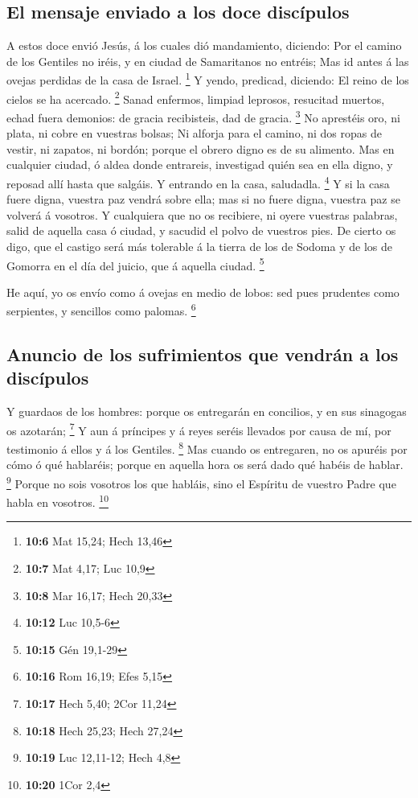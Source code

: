 \hypertarget{el-mensaje-enviado-a-los-doce-discuxedpulos}{%
\subsection{El mensaje enviado a los doce
discípulos}\label{el-mensaje-enviado-a-los-doce-discuxedpulos}}

 A estos doce envió Jesús, á los cuales dió mandamiento,
diciendo: Por el camino de los Gentiles no iréis, y en ciudad de
Samaritanos no entréis;  Mas id antes á las ovejas perdidas
de la casa de Israel. \footnote{\textbf{10:6} Mat 15,24; Hech 13,46}
 Y yendo, predicad, diciendo: El reino de los cielos se ha
acercado. \footnote{\textbf{10:7} Mat 4,17; Luc 10,9}  Sanad
enfermos, limpiad leprosos, resucitad muertos, echad fuera demonios: de
gracia recibisteis, dad de gracia. \footnote{\textbf{10:8} Mar 16,17;
  Hech 20,33}  No aprestéis oro, ni plata, ni cobre en
vuestras bolsas;  Ni alforja para el camino, ni dos ropas
de vestir, ni zapatos, ni bordón; porque el obrero digno es de su
alimento.  Mas en cualquier ciudad, ó aldea donde
entrareis, investigad quién sea en ella digno, y reposad allí hasta que
salgáis.  Y entrando en la casa, saludadla. \footnote{\textbf{10:12}
  Luc 10,5-6}  Y si la casa fuere digna, vuestra paz vendrá
sobre ella; mas si no fuere digna, vuestra paz se volverá á vosotros.
 Y cualquiera que no os recibiere, ni oyere vuestras
palabras, salid de aquella casa ó ciudad, y sacudid el polvo de vuestros
pies.  De cierto os digo, que el castigo será más tolerable
á la tierra de los de Sodoma y de los de Gomorra en el día del juicio,
que á aquella ciudad. \footnote{\textbf{10:15} Gén 19,1-29}

 He aquí, yo os envío como á ovejas en medio de lobos: sed
pues prudentes como serpientes, y sencillos como palomas. \footnote{\textbf{10:16}
  Rom 16,19; Efes 5,15}

\hypertarget{anuncio-de-los-sufrimientos-que-vendruxe1n-a-los-discuxedpulos}{%
\subsection{Anuncio de los sufrimientos que vendrán a los
discípulos}\label{anuncio-de-los-sufrimientos-que-vendruxe1n-a-los-discuxedpulos}}

 Y guardaos de los hombres: porque os entregarán en
concilios, y en sus sinagogas os azotarán; \footnote{\textbf{10:17} Hech
  5,40; 2Cor 11,24}  Y aun á príncipes y á reyes seréis
llevados por causa de mí, por testimonio á ellos y á los Gentiles.
\footnote{\textbf{10:18} Hech 25,23; Hech 27,24}  Mas
cuando os entregaren, no os apuréis por cómo ó qué hablaréis; porque en
aquella hora os será dado qué habéis de hablar. \footnote{\textbf{10:19}
  Luc 12,11-12; Hech 4,8}  Porque no sois vosotros los que
habláis, sino el Espíritu de vuestro Padre que habla en vosotros.
\footnote{\textbf{10:20} 1Cor 2,4}

